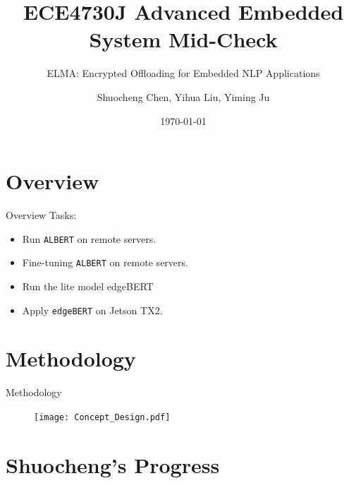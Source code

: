 \documentclass[12pt]{beamer}
\begin{document}
\title{ECE4730J Advanced Embedded System Mid-Check}
\subtitle{ELMA: Encrypted Offloading for Embedded NLP Applications}
\author[Group 3]{Shuocheng Chen, Yihua Liu, Yiming Ju}
\date{\today}
\begin{frame}
    \titlepage
\end{frame}

\section{Overview}
\begin{frame}{Overview}
Tasks:
\begin{itemize}
    \item Run \texttt{ALBERT} on remote servers.
    \item Fine-tuning \texttt{ALBERT} on remote servers.
    \item Run the lite model edgeBERT 
    \item Apply \texttt{edgeBERT} on Jetson TX2.
\end{itemize}
\end{frame}

\section{Methodology}
\begin{frame}{Methodology}
\begin{figure}[H]
    \centering
    \texttt{[image: Concept\_Design.pdf]}
\end{figure}
\end{frame}

\section{Shuocheng's Progress}
\end{document}
